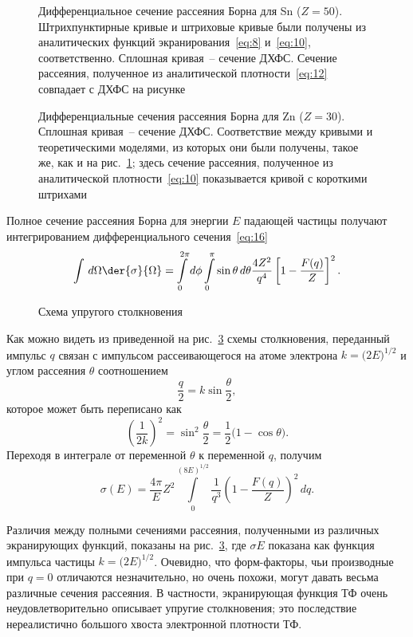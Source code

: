\documentclass[10pt,pscyr]{hedlab}
\newcommand{\eq}  [1]{\eqref{eq:#1}}
\newcommand{\pic} [1]{\ref{pic:#1}}
\begin{document}
  \begin{figure}[htb!]
    \caption{Дифференциальное сечение рассеяния Борна для Sn (\( Z = 50 \)).
      Штрихпунктирные кривые и штриховые кривые были получены из аналитических
      функций экранирования~\eq{8} и~\eq{10}, соответственно. Сплошная кривая~--
      сечение ДХФС. Сечение рассеяния, полученное из аналитической
      плотности~\eq{12} совпадает с ДХФС на рисунке}
    \label{pic:4}
  \end{figure}
  
  \begin{figure}[htb!]
    \caption{Дифференциальные сечения рассеяния Борна для Zn (\( Z = 30 \)).
      Сплошная кривая~-- сечение ДХФС. Соответствие между кривыми и
      теоретическими моделями, из которых они были получены, такое же, как и
      на рис.~\pic{4}; здесь сечение рассеяния, полученное из аналитической
      плотности~\eq{10} показывается кривой с короткими штрихами}
    \label{pic:5}
  \end{figure}
  
  Полное сечение рассеяния Борна для энергии \( E \) падающей частицы получают
  интегрированием дифференциального сечения~\eq{16} 
  \[
    \int\,d\Omega\der{\sigma}{\Omega} = \int\limits_0^{2\pi} d\phi
      \int\limits_0^\pi \sin\theta\,d\theta \frac{4Z^2}{q^4}
      \left[1 - \frac{F(q)}{Z}\right]^2.
  \]
  
  \begin{figure}[htb!]
    \caption{Схема упругого столкновения}
    \label{pic:6}
  \end{figure}
  
  Как можно видеть из приведенной на рис.~\pic{6} схемы столкновения,
  переданный импульс \( q \) связан с импульсом рассеивающегося на атоме
  электрона \( k = \bigl(2E\big)^{1/2} \) и углом рассеяния \( \theta \)
  соотношением
  \[
    \frac{q}{2} = k\sin\frac{\theta}{2},
  \]
  которое может быть переписано как
  \[
    \left(\frac{1}{2k}\right)^2 = \sin^2\frac{\theta}{2} = \frac{1}{2}
      \bigl(1 - \cos\theta\big).
  \]
  Переходя в интеграле от переменной \( \theta \) к переменной \( q \), получим
  \[
    \sigma(E) = \frac{4\pi}{E}Z^2 \int\limits_0^{(8E)^{1/2}} \frac{1}{q^3}
      \left(1 - \frac{F(q)}{Z}\right)^2\,dq.
  \]

  Различия между полными сечениями рассеяния, полученными из различных
  экранирующих функций, показаны на рис.~\pic{6}, где \( \sigma E \) показана
  как функция импульса частицы \( k = \bigl(2E\big)^{1/2} \). Очевидно,
  что форм-факторы, чьи производные при \( q = 0 \) отличаются незначительно,
  но очень похожи, могут давать весьма различные сечения рассеяния. В
  частности, экранирующая функция ТФ очень неудовлетворительно описывает
  упругие столкновения; это последствие нереалистично большого хвоста
  электронной плотности ТФ.
  
\end{document}
